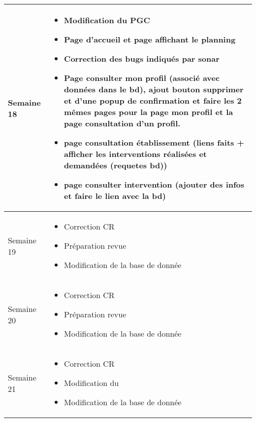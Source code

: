\documentclass [a4paper] {article}
\begin{document}
\begin{longtable}{|>{\columncolor{gray!40}}p{2cm}|p{12cm}|}
	Semaine 18 & \begin{itemize}
	\item Modification du PGC
	\item Page d'accueil et page affichant le planning
	\item Correction des bugs indiqués par sonar
	\item Page consulter mon profil (associé avec données dans le bd), ajout bouton supprimer et d'une popup de confirmation et faire les 2 mêmes pages pour la page mon profil et la page consultation d'un profil. 
	\item page consultation établissement (liens faits + afficher les interventions réalisées et demandées (requetes bd))
	\item page consulter intervention (ajouter des infos et faire le lien avec la bd)
	\end{itemize} \\
	\hline
	
	Semaine 19 & \begin{itemize}
	\item Correction CR
	\item Préparation revue 
	\item Modification de la base de donnée
	\end{itemize} \\
	\hline

	Semaine 20 & \begin{itemize}
	\item Correction CR
	\item Préparation revue 
	\item Modification de la base de donnée
	\end{itemize} \\
	\hline

	Semaine 21 & \begin{itemize}
	\item Correction CR
	\item Modification du \PGC
	\item Modification de la base de donnée
	\end{itemize} \\
	\hline
	
	
	
\end{longtable}
\end{document}
